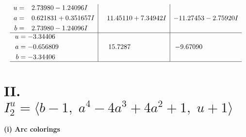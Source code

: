 \documentclass[1p]{elsarticle_modified}
\theoremstyle{definition}
\begin{document}
$$\begin{array}{c|c|c}
\begin{aligned}
u &= \phantom{-}2.73980 - 1.24096 I \\
a &= \phantom{-}0.621831 + 0.351657 I \\
b &= \phantom{-}2.73980 - 1.24096 I\end{aligned}
 & \phantom{-}11.45110 + 7.34942 I & -11.27453 - 2.75920 I \\ \hline\begin{aligned}
u &= -3.34406\phantom{ +0.000000I} \\
a &= -0.656809\phantom{ +0.000000I} \\
b &= -3.34406\phantom{ +0.000000I}\end{aligned}
 & \phantom{-}15.7287\phantom{ +0.000000I} & -9.67090\phantom{ +0.000000I}\\
 \hline 
 \end{array}$$\newpage\newpage\renewcommand{\arraystretch}{1}
\centering \section*{II. $I^u_{2}= \langle b-1,\;a^4-4 a^3+4 a^2+1,\;u+1 \rangle$}
\flushleft \textbf{(i) Arc colorings}\\
\end{document}
